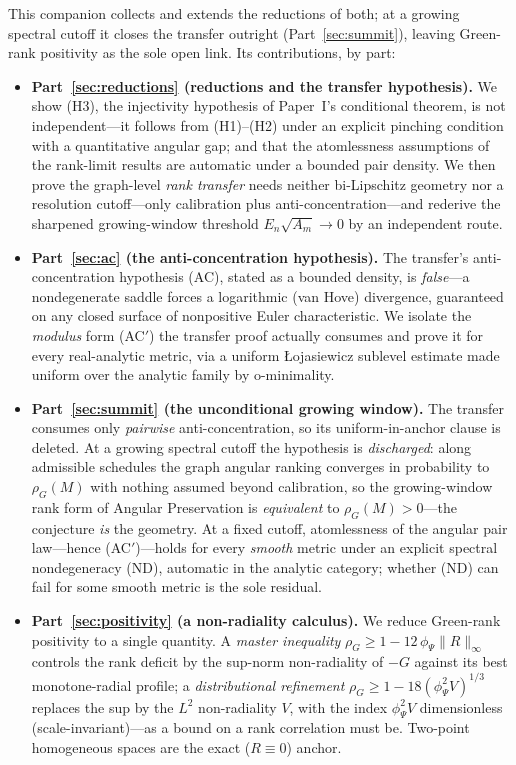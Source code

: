 \documentclass[11pt]{article}
\theoremstyle{remark}
\begin{document}
This companion collects and extends the reductions of both; at a growing spectral cutoff it
closes the transfer outright (Part~\ref{sec:summit}), leaving Green-rank positivity as the sole
open link. Its contributions, by part:

\begin{itemize}
\item \textbf{Part~\ref{sec:reductions} (reductions and the transfer hypothesis).} We show
(H3), the injectivity hypothesis of Paper~I's conditional theorem, is not independent---it
follows from (H1)--(H2) under an explicit pinching condition with a quantitative angular gap;
and that the atomlessness assumptions of the rank-limit results are automatic under a bounded
pair density. We then prove the graph-level \emph{rank transfer} needs neither bi-Lipschitz
geometry nor a resolution cutoff---only calibration plus anti-concentration---and rederive
the sharpened growing-window threshold $E_n\sqrt{A_m}\to0$ by an independent route.

\item \textbf{Part~\ref{sec:ac} (the anti-concentration hypothesis).} The transfer's
anti-concentration hypothesis (AC), stated as a bounded density, is \emph{false}---a
nondegenerate saddle forces a logarithmic (van Hove) divergence, guaranteed on any closed
surface of nonpositive Euler characteristic. We isolate the \emph{modulus} form (AC$'$) the
transfer proof actually consumes and prove it for every real-analytic metric, via a uniform
\L ojasiewicz sublevel estimate made uniform over the analytic family by o-minimality.

\item \textbf{Part~\ref{sec:summit} (the unconditional growing window).} The transfer consumes
only \emph{pairwise} anti-concentration, so its uniform-in-anchor clause is deleted. At a
growing spectral cutoff the hypothesis is \emph{discharged}: along admissible schedules the
graph angular ranking converges in probability to $\rho_G(M)$ with nothing assumed beyond
calibration, so the growing-window rank form of Angular Preservation is \emph{equivalent} to
$\rho_G(M)>0$---the conjecture \emph{is} the geometry. At a fixed cutoff, atomlessness of the
angular pair law---hence (AC$'$)---holds for every \emph{smooth} metric under an explicit
spectral nondegeneracy (ND), automatic in the analytic category; whether (ND) can fail for
some smooth metric is the sole residual.

\item \textbf{Part~\ref{sec:positivity} (a non-radiality calculus).} We reduce Green-rank
positivity to a single quantity. A \emph{master inequality} $\rho_G\ge1-12\,\phi_\Psi
\lVert R\rVert_\infty$ controls the rank deficit by the sup-norm non-radiality of $-G$ against
its best monotone-radial profile; a \emph{distributional refinement} $\rho_G\ge1-18
(\phi_\Psi^2 V)^{1/3}$ replaces the sup by the $L^2$ non-radiality $V$, with the index
$\phi_\Psi^2 V$ dimensionless (scale-invariant)---as a bound on a rank correlation must be.
Two-point homogeneous spaces are the exact ($R\equiv0$) anchor.


\end{itemize}
\end{document}
